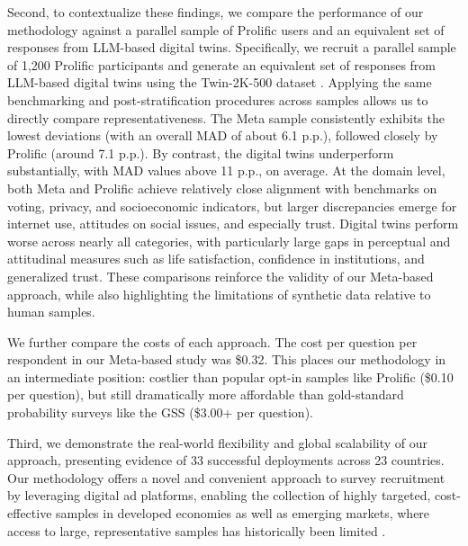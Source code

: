 Second, to contextualize these findings, we compare the performance of our methodology  against a parallel sample of Prolific users and an equivalent set of responses from LLM-based digital twins. Specifically, we recruit a parallel sample of 1,200 Prolific participants and generate an equivalent set of responses from LLM-based digital twins using the Twin-2K-500 dataset \citep{toubia2025twin}. Applying the same benchmarking and post-stratification procedures across samples allows us to directly compare representativeness. The Meta sample consistently exhibits the lowest deviations (with an overall MAD of about 6.1 p.p.), followed closely by Prolific (around 7.1 p.p.). By contrast, the digital twins underperform substantially, with MAD values above 11 p.p., on average. At the domain level, both Meta and Prolific achieve relatively close alignment with benchmarks on voting, privacy, and socioeconomic indicators, but larger discrepancies emerge for internet use, attitudes on social issues, and especially trust. Digital twins perform worse across nearly all categories, with particularly large gaps in perceptual and attitudinal measures such as life satisfaction, confidence in institutions, and generalized trust. These comparisons reinforce the validity of our Meta-based approach, while also highlighting the limitations of synthetic data relative to human samples.

We further compare the costs of each approach. The cost per question per respondent in our Meta-based study was \$0.32. This places our methodology in an intermediate position: costlier than popular opt-in samples like Prolific (\$0.10 per question), but still dramatically more affordable than gold-standard probability surveys like the GSS (\$3.00+ per question).

Third, we demonstrate the real-world flexibility and global scalability of our approach, presenting evidence of 33 successful deployments across 23 countries. Our methodology offers a novel and convenient approach to survey recruitment by leveraging digital ad platforms, enabling the collection of highly targeted, cost-effective samples in developed economies as well as emerging markets, where access to large, representative samples has historically been limited \citep{narasimhan2015marketing}. 

